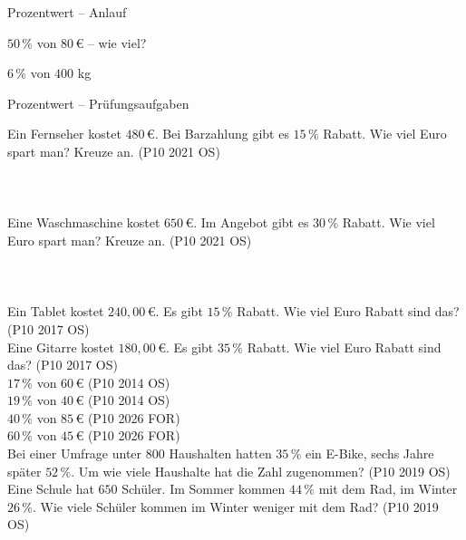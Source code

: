 \begin{aufgabe}{Prozentwert – Anlauf}
\begin{teile}
\teil $50\,\%$ von $80\,€$ – wie viel?

\leerfeld[€]
\teil $6\,\%$ von $400$ kg \leerfeld[kg]
\end{teile}
\end{aufgabe}

\begin{aufgabe}{Prozentwert – Prüfungsaufgaben}
\begin{teile}
\teil Ein Fernseher kostet $480\,€$. Bei Barzahlung gibt es $15\,\%$ Rabatt. Wie viel Euro spart man? Kreuze an. \hfill (P10 2021 OS)\\ \\ \\ \\ 
\teil Eine Waschmaschine kostet $650\,€$. Im Angebot gibt es $30\,\%$ Rabatt. Wie viel Euro spart man? Kreuze an. \hfill (P10 2021 OS)\\ \\ \\ \\ 
\teil Ein Tablet kostet $240{,}00\,€$. Es gibt $15\,\%$ Rabatt. Wie viel Euro Rabatt sind das? \hfill (P10 2017 OS) \\ \leerfeld[€]
\teil Eine Gitarre kostet $180{,}00\,€$. Es gibt $35\,\%$ Rabatt. Wie viel Euro Rabatt sind das? \hfill (P10 2017 OS) \\ \leerfeld[€]
\teil $17\,\%$ von $60\,€$ \hfill (P10 2014 OS) \\ \leerfeld[€]
\teil $19\,\%$ von $40\,€$ \hfill (P10 2014 OS) \\ \leerfeld[€]
\teil $40\,\%$ von $85\,€$ \hfill (P10 2026 FOR) \\ \leerfeld[€]
\teil $60\,\%$ von $45\,€$ \hfill (P10 2026 FOR) \\ \leerfeld[€]
\teil Bei einer Umfrage unter $800$ Haushalten hatten $35\,\%$ ein E-Bike, sechs Jahre später $52\,\%$. Um wie viele Haushalte hat die Zahl zugenommen? \hfill (P10 2019 OS)
\teil Eine Schule hat $650$ Schüler. Im Sommer kommen $44\,\%$ mit dem Rad, im Winter $26\,\%$. Wie viele Schüler kommen im Winter weniger mit dem Rad? \hfill (P10 2019 OS)
\end{teile}
\end{aufgabe}

